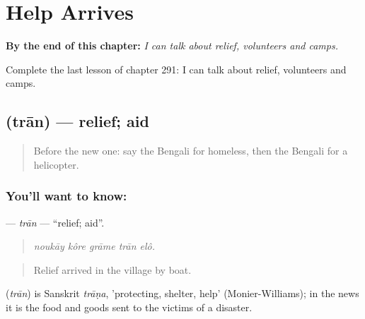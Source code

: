 
\chapter{Help Arrives}
\label{ch:bn-help-arrives}

\begin{chapteropening}
\textbf{By the end of this chapter:} \emph{I can talk about relief, volunteers and camps.}

Complete the last lesson of chapter 291: I can talk about relief, volunteers and camps.
\end{chapteropening}

\section[\texorpdfstring{\bn{ত্রাণ} (trān)}{ত্রাণ (trān)}]{ (trān) — relief; aid}

\label{lesson:BN-C291-tran}



\begin{quote}
Before the new one: say the Bengali for homeless, then the Bengali for a helicopter.
\end{quote}

\subsection*{You'll want to know: }
\textbf{} — \emph{trān} — \textquotedblleft{}relief; aid\textquotedblright{}.

\begin{quote}
    
\end{quote}

\begin{quote}
\emph{noukāy kôre grāme trān elô.}
\end{quote}

\begin{quote}
Relief arrived in the village by boat.
\end{quote}

\begin{cousinweb}
\textbf{} (\emph{trān}) is Sanskrit \emph{trāṇa}, 'protecting, shelter, help' (Monier-Williams); in the news it is the food and goods sent to the victims of a disaster.
\end{cousinweb}

